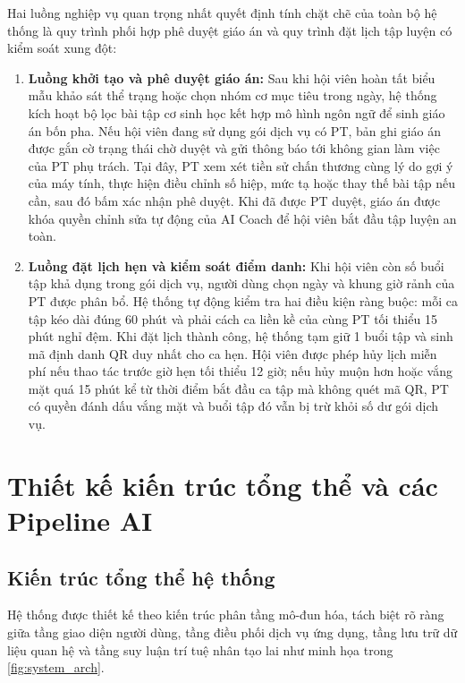 Hai luồng nghiệp vụ quan trọng nhất quyết định tính chặt chẽ của toàn bộ hệ thống là quy trình phối hợp phê duyệt giáo án và quy trình đặt lịch tập luyện có kiểm soát xung đột:
\begin{enumerate}[label=\arabic*)]
    \item \textbf{Luồng khởi tạo và phê duyệt giáo án:} Sau khi hội viên hoàn tất biểu mẫu khảo sát thể trạng hoặc chọn nhóm cơ mục tiêu trong ngày, hệ thống kích hoạt bộ lọc bài tập cơ sinh học kết hợp mô hình ngôn ngữ để sinh giáo án bốn pha. Nếu hội viên đang sử dụng gói dịch vụ có PT, bản ghi giáo án được gắn cờ trạng thái chờ duyệt và gửi thông báo tới không gian làm việc của PT phụ trách. Tại đây, PT xem xét tiền sử chấn thương cùng lý do gợi ý của máy tính, thực hiện điều chỉnh số hiệp, mức tạ hoặc thay thế bài tập nếu cần, sau đó bấm xác nhận phê duyệt. Khi đã được PT duyệt, giáo án được khóa quyền chỉnh sửa tự động của AI Coach để hội viên bắt đầu tập luyện an toàn.
    \item \textbf{Luồng đặt lịch hẹn và kiểm soát điểm danh:} Khi hội viên còn số buổi tập khả dụng trong gói dịch vụ, người dùng chọn ngày và khung giờ rảnh của PT được phân bổ. Hệ thống tự động kiểm tra hai điều kiện ràng buộc: mỗi ca tập kéo dài đúng 60 phút và phải cách ca liền kề của cùng PT tối thiểu 15 phút nghỉ đệm. Khi đặt lịch thành công, hệ thống tạm giữ 1 buổi tập và sinh mã định danh QR duy nhất cho ca hẹn. Hội viên được phép hủy lịch miễn phí nếu thao tác trước giờ hẹn tối thiểu 12 giờ; nếu hủy muộn hơn hoặc vắng mặt quá 15 phút kể từ thời điểm bắt đầu ca tập mà không quét mã QR, PT có quyền đánh dấu vắng mặt và buổi tập đó vẫn bị trừ khỏi số dư gói dịch vụ.
\end{enumerate}

\section{Thiết kế kiến trúc tổng thể và các Pipeline AI}
\label{sec:kientruc_hethong}

\subsection{Kiến trúc tổng thể hệ thống}
\label{subsec:kientruc_tongthe}

Hệ thống được thiết kế theo kiến trúc phân tầng mô-đun hóa, tách biệt rõ ràng giữa tầng giao diện người dùng, tầng điều phối dịch vụ ứng dụng, tầng lưu trữ dữ liệu quan hệ và tầng suy luận trí tuệ nhân tạo lai như minh họa trong \cref{fig:system_arch}.

